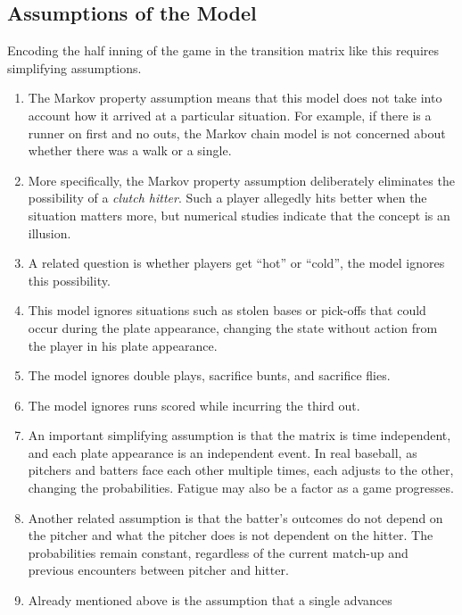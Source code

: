 \documentclass[12pt]{article}
\begin{document}
\subsection*{Assumptions of the Model} Encoding the half inning of the
game in the transition matrix like this requires simplifying
assumptions.
\begin{enumerate}
    \item
        The Markov property assumption means that this model does not
        take into account how it arrived at a particular situation.  For
        example, if there is a runner on first and no outs, the Markov
        chain model is not concerned about whether there was a walk or a
        single.
    \item
        More specifically, the Markov property assumption deliberately
        eliminates the possibility of a \emph{clutch hitter}.  Such a
        player allegedly hits better when the situation matters more,
        but numerical studies indicate that the concept is an illusion.
    \item
        A related question is whether players get ``hot'' or ``cold'',
        the model ignores this possibility.
    \item
        This model ignores situations such as stolen bases or pick-offs
        that could occur during the plate appearance, changing the state
        without action from the player in his plate appearance.
    \item
        The model ignores double plays, sacrifice bunts, and sacrifice
        flies.
    \item
        The model ignores runs scored while incurring the third out.
    \item
        An important simplifying assumption is that the matrix is time
        independent, and each plate appearance is an independent event.
        In real baseball, as pitchers and batters face each other
        multiple times, each adjusts to the other, changing the
        probabilities.  Fatigue may also be a factor as a game
        progresses.
    \item
        Another related assumption is that the batter's outcomes do not
        depend on the pitcher and what the pitcher does is not dependent
        on the hitter.  The probabilities remain constant, regardless of
        the current match-up and previous encounters between pitcher and
        hitter.
    \item
        Already mentioned above is the assumption that a single advances

\end{enumerate}
\end{document}
